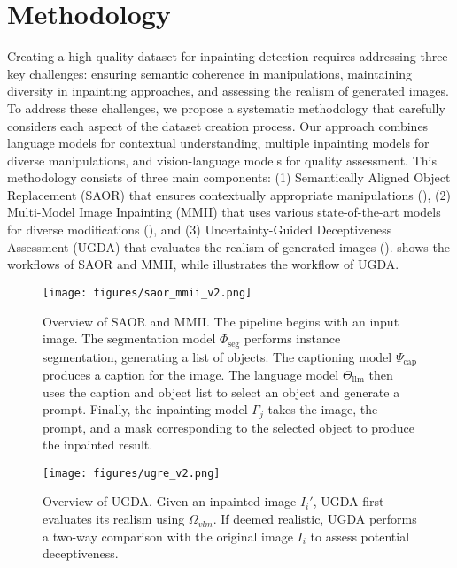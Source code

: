 \section{Methodology}
\label{sec:dataset}

Creating a high-quality dataset for inpainting detection requires addressing three key challenges: ensuring semantic coherence in manipulations, maintaining diversity in inpainting approaches, and assessing the realism of generated images. To address these challenges, we propose a systematic methodology that carefully considers each aspect of the dataset creation process. Our approach combines language models for contextual understanding, multiple inpainting models for diverse manipulations, and vision-language models for quality assessment. This methodology consists of three main components: (1) Semantically Aligned Object Replacement (SAOR) that ensures contextually appropriate manipulations (), (2) Multi-Model Image Inpainting (MMII) that uses various state-of-the-art models for diverse modifications (), and (3) Uncertainty-Guided Deceptiveness Assessment (UGDA) that evaluates the realism of generated images ().  shows the workflows of SAOR and MMII,  while  illustrates the workflow of UGDA.


\begin{figure*}[!htb]
    \centering
    \texttt{[image: figures/saor\_mmii\_v2.png]}  %
    \caption{Overview of SAOR and MMII. The pipeline begins with an input image. The segmentation model $\Phi_{\text{seg}}$ performs instance segmentation, generating a list of objects. The captioning model $\Psi_{\text{cap}}$ produces a caption for the image. The language model $\Theta_{\text{llm}}$ then uses the caption and object list to select an object and generate a prompt. Finally, the inpainting model $\Gamma_j$ takes the image, the prompt, and a mask corresponding to the selected object to produce the inpainted result.}
    \label{fig:SAOR_mmpi} 
\end{figure*}
\setlength{\textfloatsep}{12pt}
\begin{figure}[!htb]
    \centering
    \texttt{[image: figures/ugre\_v2.png]}  %
    \caption{Overview of UGDA. Given an inpainted image $I_i'$, UGDA first evaluates its realism using $\Omega_{vlm}$. If deemed realistic, UGDA performs a two-way comparison with the original image $I_i$ to assess potential deceptiveness.}
    \label{fig:ugda_fig} 
\end{figure}

